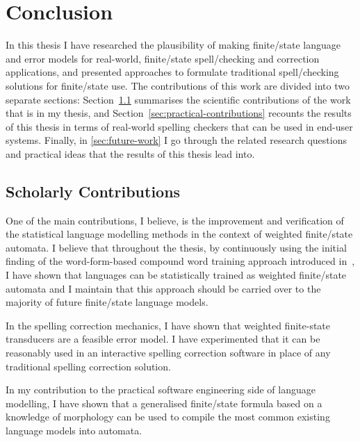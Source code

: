 \documentclass[officiallayout,final]{unihelcompling}
\begin{document}
\chapter{Conclusion}
\label{chap:conclusion}

In this thesis I have researched the plausibility of making finite\-/state
language and error models for real-world, finite\-/state spell\-/checking and
correction applications, and presented approaches to formulate traditional
spell\-/checking solutions for finite\-/state use. The contributions of this
work are divided into two separate sections:
Section~\ref{sec:scholarly-contributions} summarises the scientific
contributions of the work that is in my thesis, and
Section~\ref{sec:practical-contributions} recounts the results of this thesis
in terms of real-world spelling checkers that can be used in end-user systems.
Finally, in \ref{sec:future-work} I go through the related research questions
and practical ideas that the results of this thesis lead into.

\section{Scholarly Contributions}
\label{sec:scholarly-contributions}

One of the main contributions, I believe, is the improvement and verification
of the statistical language modelling methods in the context of weighted
finite\-/state automata. I believe that throughout the thesis, by continuously
using the initial finding of the word-form-based compound word training
approach introduced in~, I have shown that
 languages can be
statistically trained as weighted finite\-/state automata and I maintain that
this approach should be carried over to the majority of future finite\-/state
language models.

In the spelling correction mechanics, I have shown that weighted finite-state
transducers are a feasible error model. I have experimented that it can be
reasonably used in an interactive spelling correction software in place of any
traditional spelling correction solution.


In my contribution to the practical software engineering side of language
modelling, I have shown that a generalised finite\-/state formula based on a
knowledge of morphology can be used to compile the most common existing
language models into automata.
\end{document}
